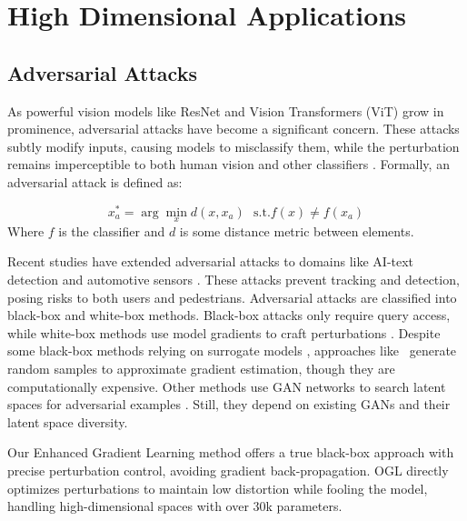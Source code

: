 \section{High Dimensional Applications}
\label{applications}
\subsection{Adversarial Attacks}

As powerful vision models like ResNet \cite{targ2016resnet} and Vision Transformers (ViT) \cite{han2022survey} grow in prominence, adversarial attacks have become a significant concern. These attacks subtly modify inputs, causing models to misclassify them, while the perturbation remains imperceptible to both human vision and other classifiers \cite{tang2019adversarial}.
Formally, an adversarial attack is defined as:

\begin{equation}
\label{eq:advarserial_min}
    x^\ast_a = \arg\min_{x} d(x, x_a) \ \ \ \text{s.t.} f(x) \neq f(x_a)
\end{equation}
Where $f$ is the classifier and $d$ is some distance metric between elements.

Recent studies have extended adversarial attacks to domains like AI-text detection \cite{sadasivan2024aigeneratedtextreliablydetected} and automotive sensors \cite{Mahima3DAttackReview}. These attacks prevent tracking and detection, posing risks to both users and pedestrians.
Adversarial attacks are classified into black-box and white-box methods. Black-box attacks only require query access, while white-box methods use model gradients to craft perturbations \cite{machado2021adversarial, cao2019adversarial}. Despite some black-box methods relying on surrogate models \cite{dong2018boosting, xiao2018generating, madry2017towards, goodfellow2014explaining}, approaches like~\cite{tu2019autozoom} generate random samples to approximate gradient estimation, though they are computationally expensive. Other methods use GAN networks to search latent spaces for adversarial examples \cite{liu2021multi, sarkar2017upset}. Still, they depend on existing GANs and their latent space diversity.


Our Enhanced Gradient Learning method offers a true black-box approach with precise perturbation control, avoiding gradient back-propagation. OGL directly optimizes perturbations to maintain low distortion while fooling the model, handling high-dimensional spaces with over 30k parameters.

